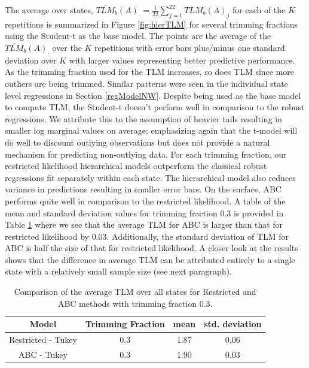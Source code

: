 \documentclass[ba]{imsart}
\begin{document}
The average over states, $\overline{TLM}_b(A)_{\cdot}= \frac{1}{22} \sum_{j =1}^{22} TLM_b(A)_{j}$ for each of the $K$ repetitions is summarized in Figure
\ref{fig:hierTLM} for several trimming fractions using the Student-t as the base model. The points are the average of the $\overline{TLM}_b(A)_{\cdot}$ over the $K$ repetitions with error bars plus/minus one standard deviation over $K$ with larger values representing better predictive performance. As the trimming fraction used for the TLM increases, so does TLM since more outliers are being trimmed. Similar patterns were seen in the individual state level regressions in Section \ref{regModelNW}. Despite being used as the base model to compute TLM, the Student-t doesn't perform well in comparison to the robust regressions. We attribute this to the assumption of heavier tails resulting in smaller log marginal values on average; emphasizing again that the t-model will do well to discount outlying observations but does not provide a natural mechanism for predicting non-outlying data. For each trimming fraction, our restricted likelihood hierarchical models outperform the classical robust regressions fit separately within each state. The hierarchical model also reduces variance in predictions resulting in smaller error bars. 
On the surface, ABC performs quite well in comparison to the restricted likelihood. A table of the mean and standard deviation values for trimming fraction $0.3$ is provided in Table \ref{tab:tlmcompare} where we see that the average TLM for ABC is larger than that for restricted likelihood by $0.03$. Additionally, the standard deviation of TLM for ABC is half the size of that for restricted likelihood. A closer look at the results shows that the difference in average TLM can be attributed entirely to a single state with a relatively small sample size (see next paragraph). 
\begin{table}[H]

\caption{\label{tab:tlmcompare}{Comparison of the average TLM over all states for Restricted and ABC methods with trimming fraction 0.3.}}
\centering
{
\begin{tabular}[t]{c|c|c|c}
\hline
Model & Trimming Fraction & mean & std. deviation\\
\hline
Restricted - Tukey & 0.3 & 1.87 & 0.06\\
\hline
ABC - Tukey & 0.3 & 1.90 & 0.03\\
\hline
\end{tabular}
}
\end{table}
 
\end{document}
